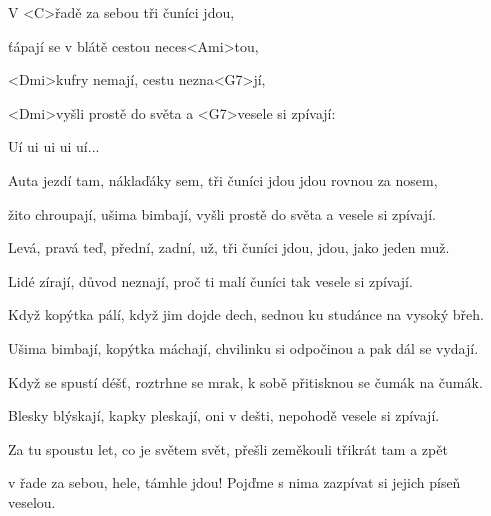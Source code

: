 

\zs
V <C>řadě za sebou tři čuníci jdou,

ťápají se v blátě cestou neces<Ami>tou,

<Dmi>kufry nemají, cestu nezna<G7>jí,

<Dmi>vyšli prostě do světa a <G7>vesele si zpívají:
\ks

\zr
Uí ui ui ui uí...
\kr

\zs
Auta jezdí tam, náklaďáky sem, tři čuníci jdou jdou rovnou za nosem,

žito chroupají, ušima bimbají, vyšli prostě do světa a vesele si zpívají.
\ks

\zr\kr

\zs
Levá, pravá teď, přední, zadní, už, tři čuníci jdou, jdou, jako jeden muž.

Lidé zírají, důvod neznají, proč ti malí čuníci tak vesele si zpívají.
\ks

\zr\kr

\zs
Když kopýtka pálí, když jim dojde dech, sednou ku studánce na vysoký břeh.

Ušima bimbají, kopýtka máchají, chvilinku si odpočinou a pak dál se vydají.
\ks

\zr\kr

\zs
Když se spustí déšť, roztrhne se mrak, k sobě přitisknou se čumák na čumák.

Blesky blýskají, kapky pleskají, oni v dešti, nepohodě vesele si zpívají.
\ks

\zr\kr

\zs
Za tu spoustu let, co je světem svět, přešli zeměkouli třikrát tam a zpět

v řade za sebou, hele, támhle jdou! Pojďme s nima zazpívat si jejich píseň veselou.
\ks

\zr\kr

\kp
